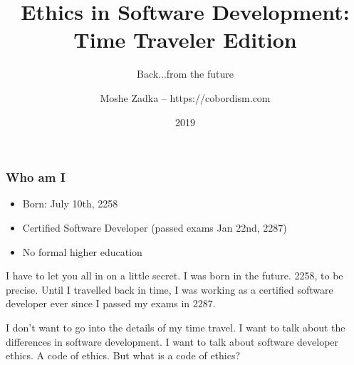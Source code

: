 \usepackage{hyperref}
\usepackage{graphicx}
\usepackage{listings}
\usepackage{textcomp}
\usepackage{fancyvrb}

\title{Ethics in Software Development: Time Traveler Edition}
\subtitle{Back...from the future}
\author{Moshe Zadka -- https://cobordism.com}
\date{2019}


\begin{titlepage}
\maketitle
\end{titlepage}

\frame{\titlepage}

\begin{frame}[fragile]
\frametitle{Who am I}

\begin{itemize}
\item Born: July 10th, 2258
\item Certified Software Developer (passed exams Jan 22nd, 2287)
\item No formal higher education
\end{itemize}

\end{frame}

I have to let you all in on a little secret.
I was born in the future.
2258, to be precise.
Until I travelled back in time,
I was working as a certified software developer ever since
I passed my exams in 2287.

I don't want to go into the details of my time travel.
I want to talk about the differences in software development.
I want to talk about software developer ethics.
A code of ethics.
But what is a code of ethics?


